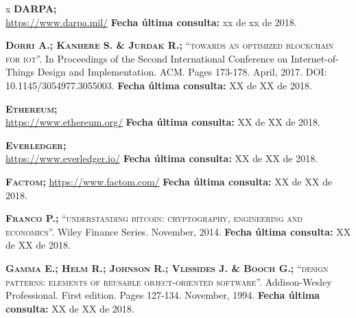 \begin{thebibliography} {x}
	 \textsc{\textbf{DARPA; }} \\ 
	\url{https://www.darpa.mil/}
	\newline \textbf{Fecha última consulta:} xx de xx de 2018.
		
	 \textsc{\textbf{Dorri A.; Kanhere S. \& Jurdak R.; }}\textsc{“towards an optimized blockchain for iot”.} In Proceedings of the Second International Conference on Internet-of-Things Design and Implementation. ACM. Pages 173-178. April, 2017. DOI: 10.1145/3054977.3055003.
	\newline \textbf{Fecha última consulta:} {\color{red}XX de XX de 2018.}
		
	 \textsc{\textbf{Ethereum; }} \\
	\url{https://www.ethereum.org/}
	\newline \textbf{Fecha última consulta:} XX de XX de 2018.
	
	 \textsc{\textbf{Everledger; }} \\
	\url{https://www.everledger.io/}
	\newline \textbf{Fecha última consulta:} XX de XX de 2018.
		
	 \textsc{\textbf{Factom; }} 
	\url{https://www.factom.com/}
	\newline \textbf{Fecha última consulta:} XX de XX de 2018.
			
	 \textsc{\textbf{Franco P.; }}\textsc{“understanding bitcoin: cryptography, engineering and economics”.} Wiley Finance Series. November, 2014. 
	\newline \textbf{Fecha última consulta:} {\color{red}XX de XX de 2018.}
		
		
		
	 \textsc{\textbf{Gamma E.; Helm R.; Johnson R.; Vlissides J. \& Booch G.; }}\textsc{“design patterns: elements of reusable object-oriented software”.} Addison-Wesley Professional. First edition. Pages 127-134. November, 1994.
	\newline \textbf{Fecha última consulta:} XX de XX de 2018.
		

\end{thebibliography}

